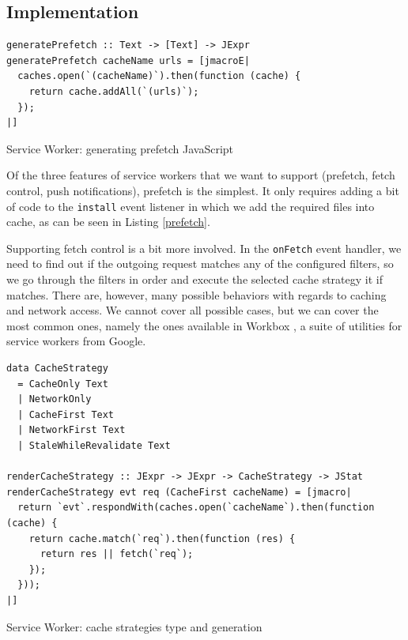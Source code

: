 \documentclass[english,zadani,odsaz]{fitthesis}
\begin{document}
\subsection{Implementation}
\label{sec:org005f77e}
\begin{listing}[t]
\begin{verbatim}
generatePrefetch :: Text -> [Text] -> JExpr
generatePrefetch cacheName urls = [jmacroE|
  caches.open(`(cacheName)`).then(function (cache) {
    return cache.addAll(`(urls)`);
  });
|]
\end{verbatim}
\caption{Service Worker: generating prefetch JavaScript \label{prefetch}}
\end{listing}

Of the three features of service workers that we want to support (prefetch,
fetch control, push notifications), prefetch is the simplest. It only requires
adding a bit of code to the \texttt{install} event listener in which we add the required
files into cache, as can be seen in Listing \ref{prefetch}.

Supporting fetch control is a bit more involved. In the \texttt{onFetch} event handler,
we need to find out if the outgoing request matches any of the configured
filters, so we go through the filters in order and execute the selected cache
strategy it if matches. There are, however, many possible behaviors with regards
to caching and network access. We cannot cover all possible cases, but we can
cover the most common ones, namely the ones available in Workbox \cite{workbox}, a
suite of utilities for service workers from Google.

\begin{listing}[!b]
\begin{verbatim}
data CacheStrategy
  = CacheOnly Text
  | NetworkOnly
  | CacheFirst Text
  | NetworkFirst Text
  | StaleWhileRevalidate Text

renderCacheStrategy :: JExpr -> JExpr -> CacheStrategy -> JStat
renderCacheStrategy evt req (CacheFirst cacheName) = [jmacro|
  return `evt`.respondWith(caches.open(`cacheName`).then(function (cache) {
    return cache.match(`req`).then(function (res) {
      return res || fetch(`req`);
    });
  }));
|]
\end{verbatim}
\caption{Service Worker: cache strategies type and generation \label{cache-strategy}}
\end{listing}
\end{document}

